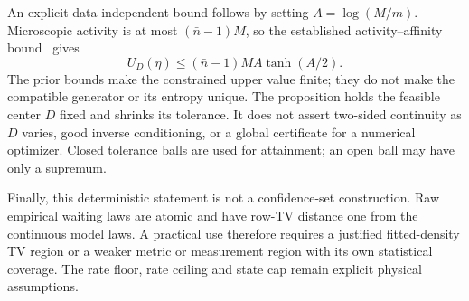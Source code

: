 An explicit data-independent bound follows by setting $A=\log(M/m)$.
Microscopic activity is at most $(\bar n-1)M$, so the established
activity--affinity bound~\cite{NishiyamaHasegawa2023} gives
\begin{equation}
 U_D(\eta)\le(\bar n-1)M A\tanh(A/2).
\end{equation}
The prior bounds make the constrained upper value finite; they do not
make the compatible generator or its entropy unique. The proposition
holds the feasible center $D$ fixed and shrinks its tolerance. It does
not assert two-sided continuity as $D$ varies, good inverse conditioning,
or a global certificate for a numerical optimizer. Closed tolerance
balls are used for attainment; an open ball may have only a supremum.

Finally, this deterministic statement is not a confidence-set
construction. Raw empirical waiting laws are atomic and have row-TV
distance one from the continuous model laws. A practical use therefore
requires a justified fitted-density TV region or a weaker metric or
measurement region with its own statistical coverage. The rate floor,
rate ceiling and state cap remain explicit physical assumptions.

